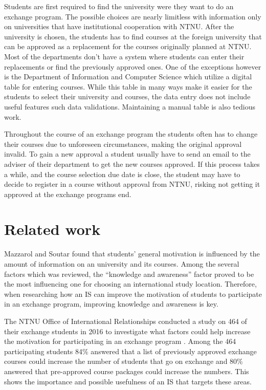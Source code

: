 Students are first required to find the university were they want to do an exchange program. The possible choices are nearly limitless  with information only on universities that have institutional cooperation with NTNU. After the university is chosen, the students has to find courses at the foreign university that can be approved as a replacement for the courses originally planned at NTNU. Most of the departments don't have a system where students can enter their replacements or find the previously approved ones. One of the exceptions however is the Department of Information and Computer Science which utilize a digital table for entering courses. While this table in many ways make it easier for the students to select their university and courses, the data entry does not include useful features such data validations. Maintaining a manual table is also tedious work. 

Throughout the course of an exchange program the students often has to change their courses due to unforeseen circumstances, making the original approval invalid. To gain a new approval a student usually have to send an email to the adviser of their department to get the new courses approved. If this process takes a while, and the course selection due date is close, the student may have to decide to register in a course without approval from NTNU, risking not getting it approved at the exchange programs end. 


\section{Related work} \label{related_work}

Mazzarol and Soutar \cite{mazzarol2002push} found that students' general motivation is influenced by the amount of information on an university and its courses. Among the several factors which was reviewed, the \enquote{knowledge and awareness} factor proved to be the most influencing one for choosing an international study location. Therefore, when researching how an IS can improve the motivation of students to participate in an exchange program, improving knowledge and awareness is key. 

The NTNU Office of International Relationships conducted a study on 464 of their exchange students in 2016 to investigate what factors could help increase the motivation for participating in an exchange program \cite{intersek_report}. Among the 464 participating students 84\% answered that a list of previously approved exchange courses could increase the number of students that go on exchange and 80\% answered that pre-approved course packages could increase the numbers. This shows the importance and possible usefulness of an IS that targets these areas. 

